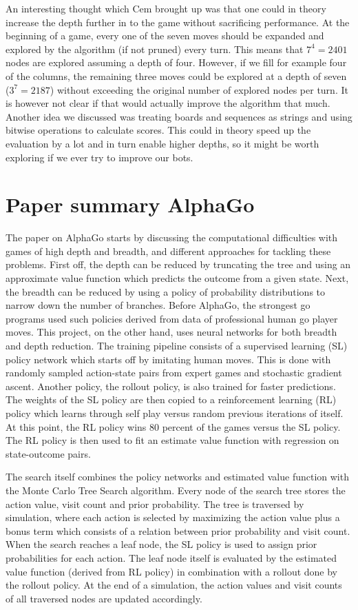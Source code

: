 \documentclass[a4paper]{article}
\begin{document}
An interesting thought which Cem brought up was that one could in theory increase the depth further in to the game without sacrificing performance. At the beginning of a game, every one of the seven moves should be expanded and explored by the algorithm (if not pruned) every turn. This means that $7^4 = 2401$ nodes are explored assuming a depth of four. However, if we fill for example four of the columns, the remaining three moves could be explored at a depth of seven ($3^7 = 2187$) without exceeding the original number of explored nodes per turn. It is however not clear if that would actually improve the algorithm that much. Another idea we discussed was treating boards and sequences as strings and using bitwise operations to calculate scores. This could in theory speed up the evaluation by a lot and in turn enable higher depths, so it might be worth exploring if we ever try to improve our bots.

\section{Paper summary AlphaGo}
The paper on AlphaGo starts by discussing the computational difficulties with games of high depth and breadth, and different approaches for tackling these problems. First off, the depth can be reduced by truncating the tree and using an approximate value function which predicts the outcome from a given state. Next, the breadth can be reduced by using a policy of probability distributions to narrow down the number of branches. Before AlphaGo, the strongest go programs used such policies derived from data of professional human go player moves. This project, on the other hand, uses neural networks for both breadth and depth reduction. The training pipeline consists of a supervised learning (SL) policy network which starts off by imitating human moves. This is done with randomly sampled action-state pairs from expert games and stochastic gradient ascent. Another policy, the rollout policy, is also trained for faster predictions. The weights of the SL policy are then copied to a reinforcement learning (RL) policy which learns through self play versus random previous iterations of itself. At this point, the RL policy wins 80 percent of the games versus the SL policy. The RL policy is then used to fit an estimate value function with regression on state-outcome pairs.

The search itself combines the policy networks and estimated value function with the Monte Carlo Tree Search algorithm. Every node of the search tree stores the action value, visit count and prior probability. The tree is traversed by simulation, where each action is selected by maximizing the action value plus a bonus term which consists of a relation between prior probability and visit count. When the search reaches a leaf node, the SL policy is used to assign prior probabilities for each action. The leaf node itself is evaluated by the estimated value function (derived from RL policy) in combination with a rollout done by the rollout policy. At the end of a simulation, the action values and visit counts of all traversed nodes are updated accordingly.
\end{document}
